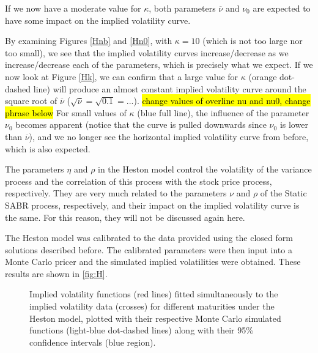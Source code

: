 If we now have a moderate value for $\kappa$, both parameters $\overline{\nu}$ and $\nu_0$ are expected to have some impact on the implied volatility curve.

By examining Figures \autoref{Hnb} and \autoref{Hn0}, with $\kappa=10$ (which is not too large nor too small), we see that the implied volatility curves increase/decrease as we increase/decrease each of the parameters, which is precisely what we expect.
If we now look at Figure \autoref{Hk}, we can confirm that a large value for $\kappa$ (orange dot-dashed line) will produce an almost constant implied volatility curve around the square root of $\overline{\nu}$ ($\sqrt{\overline{\nu}}=\sqrt{0.1}=...$).
\hl{change values of overline nu and nu0, change phrase below}
For small values of $\kappa$ (blue full line), the influence of the parameter $\nu_0$ becomes apparent (notice that the curve is pulled downwards since $\nu_0$ is lower than $\overline{\nu}$), and we no longer see the horizontal implied volatility curve from before, which is also expected.

The parameters $\eta$ and $\rho$ in the Heston model control the volatility of the variance process and the correlation of this process with the stock price process, respectively. They are very much related to the parameters $\nu$ and $\rho$ of the Static SABR process, respectively, and their impact on the implied volatility curve is the same. For this reason, they will not be discussed again here.


The Heston model was calibrated to the data provided using the closed form solutions described before. The calibrated parameters were then input into a Monte Carlo pricer and the simulated implied volatilities were obtained. These results are shown in \autoref{fig:H}.

\begin{figure}[H]
  \begin{subfigmatrix}{2}
  \end{subfigmatrix}
  \caption[Implied volatility functions fitted simultaneously to the implied volatility data for different maturities under the Heston model, plotted with their respective Monte Carlo simulated functions along with their 95\% confidence intervals.]{Implied volatility functions (red lines) fitted simultaneously to the implied volatility data (crosses) for different maturities under the Heston model, plotted with their respective Monte Carlo simulated functions (light-blue dot-dashed lines) along with their 95\% confidence intervals (blue region).}
  \label{fig:H}
\end{figure}

